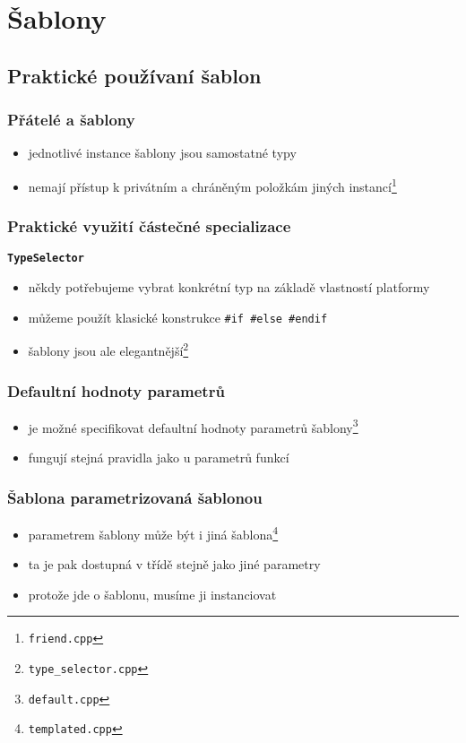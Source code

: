 \section{Šablony}
\subsection{Praktické používaní šablon}

\begin{frame} \frametitle{Přátelé a šablony}
	\begin{itemize}
		\item{jednotlivé instance šablony jsou samostatné typy}
		\item{nemají přístup k privátním a chráněným položkám jiných instancí\footnote{\texttt{friend.cpp}}}
	\end{itemize}
\end{frame}

\begin{frame} \frametitle{Praktické využití částečné specializace}
	\textbf{\texttt{TypeSelector}}\\
	\begin{itemize}
		\item{někdy potřebujeme vybrat konkrétní typ na základě vlastností platformy}
		\item{můžeme použít klasické konstrukce \texttt{\#if \#else \#endif}}
		\item{šablony jsou ale elegantnější\footnote{\texttt{type\_selector.cpp}}}
	\end{itemize}
\end{frame}

\begin{frame} \frametitle{Defaultní hodnoty parametrů}
	\begin{itemize}
		\item{je možné specifikovat defaultní hodnoty parametrů šablony\footnote{\texttt{default.cpp}}}
		\item{fungují stejná pravidla jako u parametrů funkcí}
	\end{itemize}
\end{frame}

\begin{frame} \frametitle{Šablona parametrizovaná šablonou}
	\begin{itemize}
		\item{parametrem šablony může být i jiná šablona\footnote{\texttt{templated.cpp}}}
		\item{ta je pak dostupná v třídě stejně jako jiné parametry}
		\item{protože jde o šablonu, musíme ji instanciovat}
	\end{itemize}
\end{frame}

